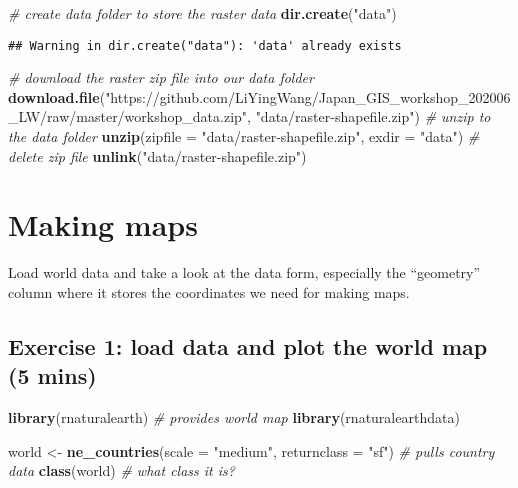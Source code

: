 \documentclass[
  xelatex,ja=standard]{bxjsarticle}
\newenvironment{Shaded}{\begin{snugshade}}{\end{snugshade}}
\newcommand{\CommentTok}[1]{\textcolor[rgb]{0.56,0.35,0.01}{\textit{#1}}}
\newcommand{\DataTypeTok}[1]{\textcolor[rgb]{0.13,0.29,0.53}{#1}}
\newcommand{\KeywordTok}[1]{\textcolor[rgb]{0.13,0.29,0.53}{\textbf{#1}}}
\newcommand{\NormalTok}[1]{#1}
\newcommand{\StringTok}[1]{\textcolor[rgb]{0.31,0.60,0.02}{#1}}
\begin{document}
\begin{Shaded}
\begin{Highlighting}[]
\CommentTok{# create data folder to store the raster data }
\KeywordTok{dir.create}\NormalTok{(}\StringTok{"data"}\NormalTok{)}
\end{Highlighting}
\end{Shaded}

\begin{verbatim}
## Warning in dir.create("data"): 'data' already exists
\end{verbatim}

\begin{Shaded}
\begin{Highlighting}[]
\CommentTok{# download the raster zip file into our data folder}
\KeywordTok{download.file}\NormalTok{(}\StringTok{"https://github.com/LiYingWang/Japan_GIS_workshop_202006_LW/raw/master/workshop_data.zip"}\NormalTok{, }\StringTok{"data/raster-shapefile.zip"}\NormalTok{)}
\CommentTok{# unzip to the data folder}
\KeywordTok{unzip}\NormalTok{(}\DataTypeTok{zipfile =} \StringTok{"data/raster-shapefile.zip"}\NormalTok{, }\DataTypeTok{exdir =} \StringTok{"data"}\NormalTok{)}
\CommentTok{# delete zip file}
\KeywordTok{unlink}\NormalTok{(}\StringTok{"data/raster-shapefile.zip"}\NormalTok{)}
\end{Highlighting}
\end{Shaded}

\hypertarget{making-maps}{%
\section{Making maps}\label{making-maps}}

Load world data and take a look at the data form, especially the
``geometry'' column where it stores the coordinates we need for making
maps.

\hypertarget{exercise-1-load-data-and-plot-the-world-map-5-mins}{%
\subsection{Exercise 1: load data and plot the world map (5
mins)}\label{exercise-1-load-data-and-plot-the-world-map-5-mins}}

\begin{Shaded}
\begin{Highlighting}[]
\KeywordTok{library}\NormalTok{(rnaturalearth) }\CommentTok{# provides world map}
\KeywordTok{library}\NormalTok{(rnaturalearthdata)}

\NormalTok{world <-}\StringTok{ }\KeywordTok{ne_countries}\NormalTok{(}\DataTypeTok{scale =} \StringTok{"medium"}\NormalTok{, }\DataTypeTok{returnclass =} \StringTok{"sf"}\NormalTok{) }\CommentTok{# pulls country data }
\KeywordTok{class}\NormalTok{(world) }\CommentTok{# what class it is?}
\end{Highlighting}
\end{Shaded}
\end{document}
